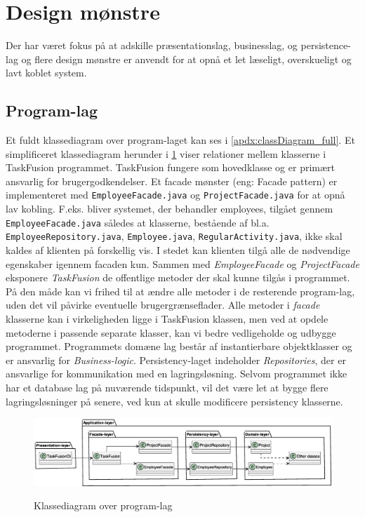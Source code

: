 \section{Design mønstre} \label{chap:design}
Der har været fokus på at adskille præsentationslag, businesslag, og persistence-lag og flere design mønstre er anvendt for at opnå et let læseligt, overskueligt og lavt koblet system.
\subsection{Program-lag}
Et fuldt klassediagram over program-laget kan ses i \cref{apdx:classDiagram_full}. Et simplificeret klassediagram herunder i \cref{fig:class_persistency_layer} viser relationer mellem klasserne i TaskFusion programmet. TaskFusion fungere som hovedklasse og er primært ansvarlig for brugergodkendelser. Et facade mønster (eng: Facade pattern) er implementeret med \texttt{EmployeeFacade.java} og \texttt{ProjectFacade.java} for at opnå lav kobling. F.eks. bliver systemet, der behandler employees, tilgået gennem \texttt{EmployeeFacade.java} således at klasserne, bestående af bl.a. \texttt{EmployeeRepository.java}, \texttt{Employee.java}, \texttt{RegularActivity.java}, ikke skal kaldes af klienten på forskellig vis. I stedet kan klienten tilgå alle de nødvendige egenskaber igennem facaden kun. Sammen med \textit{EmployeeFacade} og \textit{ProjectFacade} eksponere \textit{TaskFusion} de offentlige metoder der skal kunne tilgås i programmet. På den måde kan vi frihed til at ændre alle metoder i de resterende program-lag, uden det vil påvirke eventuelle brugergrænseflader. Alle metoder i \textit{facade} klasserne kan i virkeligheden ligge i TaskFusion klassen, men ved at opdele metoderne i passende separate klasser, kan vi bedre vedligeholde og udbygge programmet.
Programmets domæne lag består af instantierbare objektklasser og er ansvarlig for \textit{Business-logic}. Persistency-laget indeholder \textit{Repositories}, der er ansvarlige for kommunikation med en lagringsløsning. Selvom programmet ikke har et database lag på nuværende tidspunkt, vil det være let at bygge flere lagringsløsninger på senere, ved kun at skulle modificere persistency klasserne.
\begin{figure}[H]
    \centering
    \caption{Klassediagram over program-lag}
    \includegraphics[width = \textwidth]{ImplementationAndTest/Diagrams/ClassDiagrams/ClassDiagram_layer.eps}
    \label{fig:class_persistency_layer}
\end{figure}
